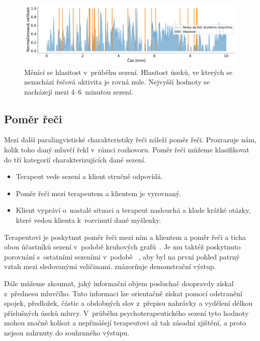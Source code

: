 \begin{figure}[ht]
  \centering
  \includegraphics[width=\linewidth]{obrazky-figures/text_plots/therapist_volume.pdf}
  \caption{Měnící se hlasitost v~průběhu sezení. Hlasitost úseků, ve kterých se nenachází řečová aktivita je rovná nule. Nejvyšší hodnoty se nacházejí mezi 4--6~minutou sezení.}
  \label{fig:Statisctics_loudness}
\end{figure}


\subsection{Poměr řeči}
Mezi další paralingvistické charakteristiky řeči náleží poměr řeči. Prozrazuje nám, kolik toho daný mluvčí řekl v~rámci rozhovoru. Poměr řeči můžeme klasifikovat do tří kategorií charakterizujících dané sezení.
\begin{itemize}
    \item Terapeut vede sezení a klient stručně odpovídá. 
    \item Poměr řeči mezi terapeutem a klientem je vyrovnaný.
    \item Klient vypráví o~nastalé situaci a terapeut naslouchá a klade krátké otázky, které vedou klienta k~rozvinutí dané myšlenky.
\end{itemize}

Terapeutovi je poskytnut poměr řeči mezi ním a klientem a poměr řeči a ticha obou účastníků sezení v~podobě kruhových grafů~\cite{Visualization_pie}. Je mu taktéž poskytnuto porovnání s~ostatními sezeními v~podobě ~\cite{ibm_gauge}, aby byl na první pohled patrný vztah mezi sledovanými veličinami.  znázorňuje demonstrační výstup.

Dále můžeme zkoumat, jaký informační objem posluchač doopravdy získal z~přednesu mluvčího. Tuto informaci lze orientačně získat pomocí odstranění spojek, předložek, částic a obdobných slov z~přepisu nahrávky a vydělení délkou příslušných úseků mluvy. V~průběhu psychoterapeutického sezení tyto hodnoty mohou značně kolísat a nepřinášejí terapeutovi až tak zásadní zjištění, a proto nejsou zahrnuty do souhrnného výstupu.


